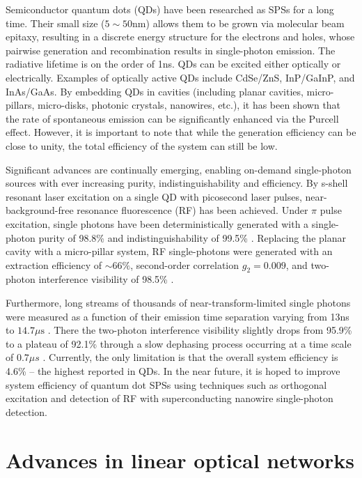 \documentclass[aps,rmp,twocolumn,amsmath,amssymb,nofootinbib,superscriptaddress]{revtex4}
\begin{document}
Semiconductor quantum dots (QDs) have been researched as SPSs for a long time. Their small size (\mbox{$5\sim50$}nm) allows them to be grown via molecular beam epitaxy, resulting in a discrete energy structure for the electrons and holes, whose pairwise generation and recombination results in single-photon emission. The radiative lifetime is on the order of 1ns. QDs can be excited either optically or electrically. Examples of optically active QDs include CdSe/ZnS, InP/GaInP, and InAs/GaAs. By embedding QDs in cavities (including planar cavities, micro-pillars, micro-disks, photonic crystals, nanowires, etc.), it has been shown that the rate of spontaneous emission can be significantly enhanced via the Purcell effect. However, it is important to note that while the generation efficiency can be close to unity, the total efficiency of the system can still be low.

Significant advances are continually emerging, enabling on-demand single-photon sources with ever increasing purity, indistinguishability and efficiency. By s-shell resonant laser excitation on a single QD with picosecond laser pulses, near-background-free resonance fluorescence (RF) has been achieved. Under $\pi$ pulse excitation, single photons have been deterministically generated with a single-photon purity of 98.8\% \cite{bib:47} and indistinguishability of 99.5\% \cite{bib:48}. Replacing the planar cavity with a micro-pillar system, RF single-photons were generated with an extraction efficiency of \mbox{$\sim 66\%$}, second-order correlation \mbox{$g_2=0.009$}, and two-photon interference visibility of 98.5\% \cite{bib:49, bib:50}.

Furthermore, long streams of thousands of near-transform-limited single photons were measured as a function of their emission time separation varying from 13ns to $14.7\mu\mathrm{s}$ \cite{bib:51, bib:52}. There the two-photon interference visibility slightly drops from 95.9\% to a plateau of 92.1\% through a slow dephasing process occurring at a time scale of \mbox{$0.7\mu s$} \cite{bib:51}. Currently, the only limitation is that the overall system efficiency is 4.6\% -- the highest reported in QDs. In the near future, it is hoped to improve system efficiency of quantum dot SPSs using techniques such as orthogonal excitation and detection of RF with superconducting nanowire single-photon detection.

\section{Advances in linear optical networks} \label{sec:adv_networks}
\end{document}
